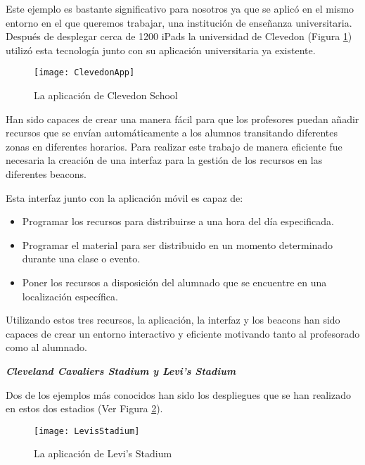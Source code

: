 Este ejemplo es bastante significativo para nosotros ya que se aplicó en el mismo entorno en el que queremos trabajar, una institución de enseñanza universitaria. Después de desplegar cerca de 1200 iPads  la universidad de Clevedon (Figura \ref{fig:clevedonApp}) utilizó esta tecnología junto con su aplicación universitaria ya existente. 

\begin{figure}[H]
	\centering
	\texttt{[image: ClevedonApp]}
	\caption{La aplicación de Clevedon School}
	\label{fig:clevedonApp}
\end{figure}


Han sido capaces de crear una manera fácil para que los profesores puedan añadir recursos que se envían automáticamente a los alumnos transitando diferentes zonas en diferentes horarios. Para realizar este trabajo de manera eficiente fue necesaria la creación de una interfaz para la gestión de los recursos en las diferentes beacons.


Esta interfaz junto con la aplicación móvil es capaz de: 

\begin{itemize}
\item Programar los recursos para distribuirse a una hora del día especificada. 
\item Programar el material para ser distribuido en un momento determinado durante una clase o evento. 
\item Poner los recursos a disposición del alumnado que se encuentre en una localización específica.
\end{itemize}

Utilizando estos tres recursos, la aplicación, la interfaz y los beacons han sido capaces de crear un entorno interactivo y eficiente motivando tanto al profesorado como al alumnado. 

\vspace{5mm}

\textsl{\textbf{{Cleveland Cavaliers Stadium y Levi's Stadium}}}

\vspace{2mm}

Dos de los ejemplos más conocidos han sido los despliegues que se han realizado en estos dos estadios (Ver Figura \ref{fig:levisStadium}). 

\begin{figure}[H]
	\centering
	\texttt{[image: LevisStadium]}
	\caption{La aplicación de Levi's Stadium}
	\label{fig:levisStadium}
\end{figure}

